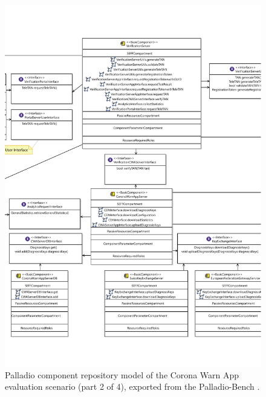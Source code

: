 \begin{figure}
    \centering
    \includegraphics[width=\textwidth]{figures/chapter12/cwa2.pdf}
    \caption[Palladio component repository model of the Corona Warn App evaluation scenario (part 2 of 4).]{Palladio component repository model of the Corona Warn App evaluation scenario (part 2 of 4), exported from the Palladio-Bench \cite{reussner_palladio_2024}.}
    \label{fig:appendix:cwa:2}
\end{figure}

